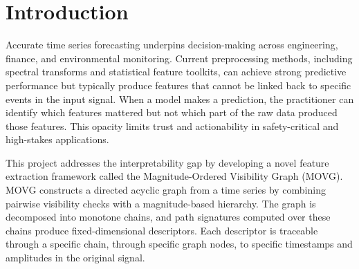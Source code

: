 \documentclass[a4paper,12pt]{article}
\begin{document}
\newpage

\begin{abstract}
Time series preprocessing methods typically discard the structural link between extracted features and specific events in the input signal. This report presents the Magnitude-Ordered Visibility Graph (MOVG), a framework that converts a time series into a directed acyclic hierarchy by combining geometric visibility checks with magnitude-based ordering. The hierarchy is decomposed into monotone chains, from which path-signature projections and structural descriptors produce a fixed-length feature vector. Every feature is traceable through a specific chain and set of graph nodes back to identifiable timestamps in the raw signal. When combined with SHAP attribution, this provenance enables a complete backtrace from model prediction to raw data.

The framework was formally specified, implemented as a Python package with 13 modules and 45 unit tests, and evaluated against FFT and wavelet preprocessing across seven datasets and six regression models. MOVG recorded the lowest mean RMSE on every dataset, with an average improvement of 15.1\% over the best non-MOVG baseline. A 32-feature reduced representation retained this performance advantage while supporting deterministic post-inference backtracing.
\end{abstract}

\section{Introduction}
\label{sec:introduction}

Accurate time series forecasting underpins decision-making across engineering, finance, and environmental monitoring. Current preprocessing methods, including spectral transforms and statistical feature toolkits, can achieve strong predictive performance but typically produce features that cannot be linked back to specific events in the input signal. When a model makes a prediction, the practitioner can identify which features mattered but not which part of the raw data produced those features. This opacity limits trust and actionability in safety-critical and high-stakes applications.

This project addresses the interpretability gap by developing a novel feature extraction framework called the Magnitude-Ordered Visibility Graph (MOVG). MOVG constructs a directed acyclic graph from a time series by combining pairwise visibility checks with a magnitude-based hierarchy. The graph is decomposed into monotone chains, and path signatures computed over these chains produce fixed-dimensional descriptors. Each descriptor is traceable through a specific chain, through specific graph nodes, to specific timestamps and amplitudes in the original signal.
\end{document}
